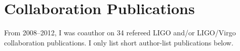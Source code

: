 
\section{\sc Collaboration Publications}
From 2008--2012, I was coauthor on 34 refereed LIGO and/or LIGO/Virgo
collaboration publications. I only list short author-list publications below.

